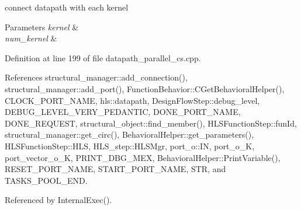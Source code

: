 connect datapath with each kernel 


\begin{DoxyParams}{Parameters}
{\em kernel} & \\
\hline
{\em num\+\_\+kernel} & \\
\hline
\end{DoxyParams}


Definition at line 199 of file datapath\+\_\+parallel\+\_\+cs.\+cpp.



References structural\+\_\+manager\+::add\+\_\+connection(), structural\+\_\+manager\+::add\+\_\+port(), Function\+Behavior\+::\+C\+Get\+Behavioral\+Helper(), C\+L\+O\+C\+K\+\_\+\+P\+O\+R\+T\+\_\+\+N\+A\+ME, hls\+::datapath, Design\+Flow\+Step\+::debug\+\_\+level, D\+E\+B\+U\+G\+\_\+\+L\+E\+V\+E\+L\+\_\+\+V\+E\+R\+Y\+\_\+\+P\+E\+D\+A\+N\+T\+IC, D\+O\+N\+E\+\_\+\+P\+O\+R\+T\+\_\+\+N\+A\+ME, D\+O\+N\+E\+\_\+\+R\+E\+Q\+U\+E\+ST, structural\+\_\+object\+::find\+\_\+member(), H\+L\+S\+Function\+Step\+::fun\+Id, structural\+\_\+manager\+::get\+\_\+circ(), Behavioral\+Helper\+::get\+\_\+parameters(), H\+L\+S\+Function\+Step\+::\+H\+LS, H\+L\+S\+\_\+step\+::\+H\+L\+S\+Mgr, port\+\_\+o\+::\+IN, port\+\_\+o\+\_\+K, port\+\_\+vector\+\_\+o\+\_\+K, P\+R\+I\+N\+T\+\_\+\+D\+B\+G\+\_\+\+M\+EX, Behavioral\+Helper\+::\+Print\+Variable(), R\+E\+S\+E\+T\+\_\+\+P\+O\+R\+T\+\_\+\+N\+A\+ME, S\+T\+A\+R\+T\+\_\+\+P\+O\+R\+T\+\_\+\+N\+A\+ME, S\+TR, and T\+A\+S\+K\+S\+\_\+\+P\+O\+O\+L\+\_\+\+E\+ND.



Referenced by Internal\+Exec().

